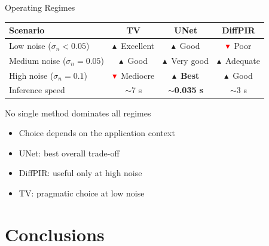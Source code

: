 \documentclass[english,10pt]{beamer}
\newcommand{\upgreen}{\textcolor{green!50!black}{$\blacktriangle$}}
\newcommand{\downred}{\textcolor{red}{$\blacktriangledown$}}
\begin{document}
\begin{frame}{Operating Regimes}
  \begin{center}
    \begin{tabular}{lccc}\toprule
      \textbf{Scenario} & \textbf{TV} & \textbf{UNet} & \textbf{DiffPIR}\\\midrule
      Low noise ($\sigma_n<0.05$) & \upgreen\ Excellent & \upgreen\ Good & \downred\ Poor\\
      Medium noise ($\sigma_n=0.05$) & \upgreen\ Good & \upgreen\ Very good & \upgreen\ Adequate\\
      High noise ($\sigma_n=0.1$)   & \downred\ Mediocre & \upgreen\ \textbf{Best} & \upgreen\ Good\\
      Inference speed           & $\sim$7 s & $\sim$\textbf{0.035 s} & $\sim$3 s\\\bottomrule
    \end{tabular}
  \end{center}
  \vspace{0.3cm}
  \begin{block}{No single method dominates all regimes}
    \begin{itemize}
      \item Choice depends on the application context
      \item UNet: best overall trade-off
      \item DiffPIR: useful only at high noise
      \item TV: pragmatic choice at low noise
    \end{itemize}
  \end{block}
\end{frame}

\section{Conclusions}
\end{document}

